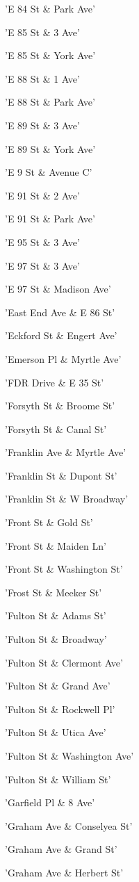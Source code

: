 \documentclass[11pt]{article}
\begin{document}
\begin{enumerate*}
\item 'E 84 St \& Park Ave'
\item 'E 85 St \& 3 Ave'
\item 'E 85 St \& York Ave'
\item 'E 88 St \& 1 Ave'
\item 'E 88 St \& Park Ave'
\item 'E 89 St \& 3 Ave'
\item 'E 89 St \& York Ave'
\item 'E 9 St \& Avenue C'
\item 'E 91 St \& 2 Ave'
\item 'E 91 St \& Park Ave'
\item 'E 95 St \& 3 Ave'
\item 'E 97 St \& 3 Ave'
\item 'E 97 St \& Madison Ave'
\item 'East End Ave \& E 86 St'
\item 'Eckford St \& Engert Ave'
\item 'Emerson Pl \& Myrtle Ave'
\item 'FDR Drive \& E 35 St'
\item 'Forsyth St \& Broome St'
\item 'Forsyth St \& Canal St'
\item 'Franklin Ave \& Myrtle Ave'
\item 'Franklin St \& Dupont St'
\item 'Franklin St \& W Broadway'
\item 'Front St \& Gold St'
\item 'Front St \& Maiden Ln'
\item 'Front St \& Washington St'
\item 'Frost St \& Meeker St'
\item 'Fulton St \& Adams St'
\item 'Fulton St \& Broadway'
\item 'Fulton St \& Clermont Ave'
\item 'Fulton St \& Grand Ave'
\item 'Fulton St \& Rockwell Pl'
\item 'Fulton St \& Utica Ave'
\item 'Fulton St \& Washington Ave'
\item 'Fulton St \& William St'
\item 'Garfield Pl \& 8 Ave'
\item 'Graham Ave \& Conselyea St'
\item 'Graham Ave \& Grand St'
\item 'Graham Ave \& Herbert St'

\end{enumerate*}
\end{document}
